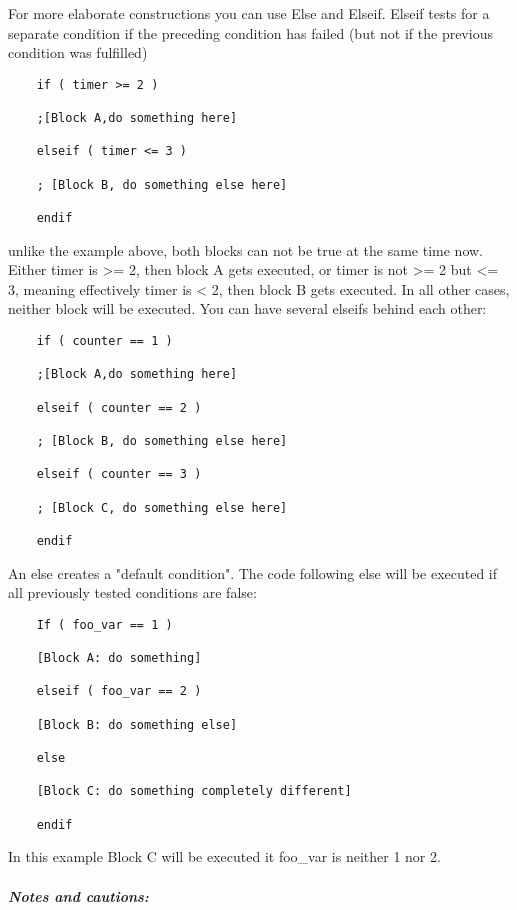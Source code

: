 For more elaborate constructions you can use Else and Elseif. Elseif
tests for a separate condition if the preceding condition has failed
(but not if the previous condition was fulfilled)

\begin{lstlisting}
	if ( timer >= 2 )
	
	;[Block A,do something here]
	
	elseif ( timer <= 3 )
	
	; [Block B, do something else here]
	
	endif
\end{lstlisting}

unlike the example above, both blocks can not be true at the same time
now. Either timer is >= 2, then block A gets executed, or
timer is not >= 2 but <= 3, meaning effectively timer
is < 2, then block B gets executed. In all other cases,
neither block will be executed. You can have several elseifs behind each
other:

\begin{lstlisting}
	if ( counter == 1 )
	
	;[Block A,do something here]
	
	elseif ( counter == 2 )
	
	; [Block B, do something else here]
	
	elseif ( counter == 3 )
	
	; [Block C, do something else here]
	
	endif
\end{lstlisting}

An else creates a "default condition". The code following else will be
executed if all previously tested conditions are false:

\begin{lstlisting}
	If ( foo_var == 1 )
	
	[Block A: do something]
	
	elseif ( foo_var == 2 )
	
	[Block B: do something else]
	
	else
	
	[Block C: do something completely different]
	
	endif
\end{lstlisting}

In this example Block C will be executed it foo\_var is neither 1 nor 2.

\hypertarget{notes-and-cautions}{%
\subparagraph{Notes and cautions:}\label{notes-and-cautions}}


